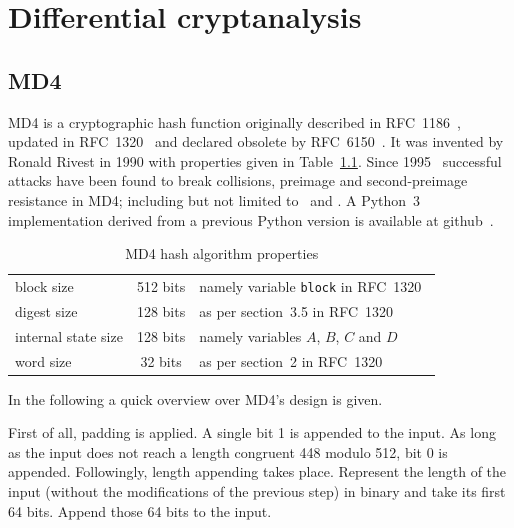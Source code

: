 \renewcommand*\chappic{img/diff-crypt.pdf}
\renewcommand*\chapquote{Just because it's automatic doesn't mean it works. \\ ---Daniel J. Bernstein}
\chapter{Differential cryptanalysis}
\label{ch:dc}
%
\section{MD4}
\label{sec:dc-md4}
%
MD4 is a cryptographic hash function originally described in RFC~1186~\cite{rfc1186},
updated in RFC~1320~\cite{rfc1320} and declared obsolete by RFC~6150~\cite{rfc6150}. It was
invented by Ronald Rivest in 1990 with properties given in Table~\ref{tab:md4}.
Since 1995~\cite{Dobbertin1998} successful attacks have been found to break collisions,
preimage and second-preimage resistance in MD4; including but not limited to~\cite{md4-2007} and
\cite{cryptoeprint:2005:151}. A Python~3 implementation derived from a previous Python version
is available at github~\cite{md4-py3k}.

\begin{table}[h]
  \begin{center}
    \begin{tabular}{lcl}
      block size           & 512 bits       & namely variable \texttt{block} in RFC~1320~\cite{rfc1320} \\
      digest size          & 128 bits       & as per section~3.5 in RFC~1320~\cite{rfc1320} \\
      internal state size  & 128 bits       & namely variables $A$, $B$, $C$ and $D$ \\
      word size            & 32 bits        & as per section~2 in RFC~1320~\cite{rfc1320} \\
    \end{tabular}
    \caption{MD4 hash algorithm properties}
    \label{tab:md4}
  \end{center}
\end{table}

In the following a quick overview over MD4's design is given.

First of all, padding is applied. A single bit 1 is appended to the
input. As long as the input does not reach a length congruent 448 modulo 512,
bit 0 is appended.
Followingly, length appending takes place. Represent the length of the input
(without the modifications of the previous step) in binary and take its first
64 bits. Append those 64 bits to the input.

